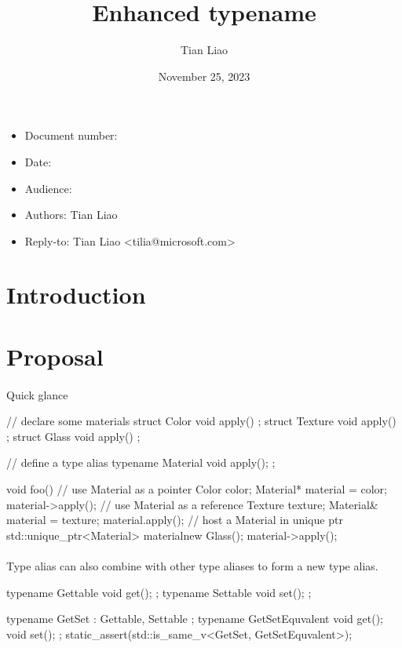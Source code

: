 \documentclass{article}
\title{Enhanced typename}
\author{Tian Liao}
\date{November 25, 2023}
\begin{document}
\maketitle
\vfill
\begin{itemize}[noitemsep]
  \item[] Document number:
  \item[] Date:
  \item[] Audience:
  \item[] Authors: Tian Liao
  \item[] Reply-to: Tian Liao \textless tilia@microsoft.com\textgreater
\end{itemize}

\newpage
{}

\section{Introduction}

\section{Proposal}

\paragraph{}
Quick glance
\begin{codeblock}
// declare some materials
struct Color { void apply() {} };
struct Texture { void apply() {} };
struct Glass { void apply() {} };

// define a type alias
typename Material { void apply(); };

void foo() {
  {
    // use Material as a pointer
    Color color;
    Material* material = color;
    material->apply();
  }
  {
    // use Material as a reference
    Texture texture;
    Material& material = texture;
    material.apply();
  }
  {
    // host a Material in unique ptr
    std::unique_ptr<Material> material{new Glass()};
    material->apply();
  }
}
\end{codeblock}

\paragraph{}
Type alias can also combine with other type aliases to form a new type alias.
\begin{codeblock}
typename Gettable{ void get(); };
typename Settable{ void set(); };

typename GetSet : Gettable, Settable {};
typename GetSetEquvalent {
  void get();
  void set();
};
static_assert(std::is_same_v<GetSet, GetSetEquvalent>);
\end{codeblock}
\end{document}
